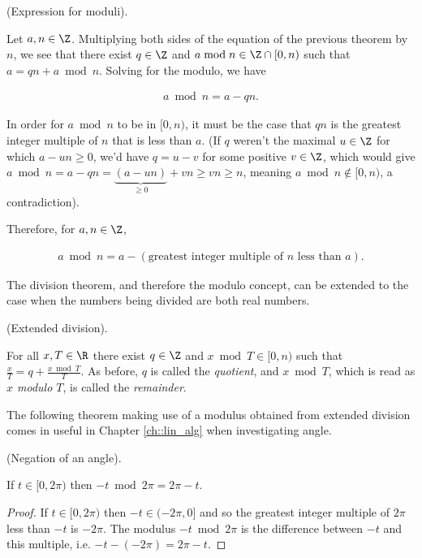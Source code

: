 \begin{deriv}
	(Expression for moduli).
	
	Let $a, n \in \Z$. Multiplying both sides of the equation of the previous theorem by $n$, we see that there exist $q \in \Z$ and $a \bmod n \in \Z \cap [0, n)$ such that $a = qn + a \bmod n$. Solving for the modulo, we have
	
	\begin{align*}
		a \bmod n = a - qn.
	\end{align*}
	
	In order for $a \bmod n$ to be in $[0, n)$, it must be the case that $qn$ is the greatest integer multiple of $n$ that is less than $a$. (If $q$ weren't the maximal $u \in \Z$ for which $a - un \geq 0$, we'd have $q = u - v$ for some positive $v \in \Z$, which would give $a \bmod n = a - qn = \underbrace{(a - un)}_{\geq 0} + vn \geq vn \geq n$, meaning $a \bmod n \notin [0, n)$, a contradiction).
	
	Therefore, for $a, n \in \Z$,
	
	\begin{align*}
		a \bmod n = a - (\text{greatest integer multiple of $n$ less than $a$}).
	\end{align*}
\end{deriv}

The division theorem, and therefore the modulo concept, can be extended to the case when the numbers being divided are both real numbers.

\begin{theorem}
    (Extended division).

    For all $x, T \in \R$ there exist $q \in \Z$ and $x \bmod T \in [0, n)$ such that $\frac{x}{T} = q + \frac{x \bmod T}{T}$. As before, $q$ is called the \textit{quotient}, and $x \bmod T$, which is read as \textit{$x$ modulo $T$}, is called the \textit{remainder}.
\end{theorem}

The following theorem making use of a modulus obtained from extended division comes in useful in Chapter \ref{ch::lin_alg} when investigating angle.

\begin{theorem}
\label{ch::appendix::thm::negation_of_angle}
    (Negation of an angle).

    If $t \in [0, 2\pi)$ then $-t \bmod 2\pi = 2\pi - t$.
\end{theorem}

\begin{proof}
    If $t \in [0, 2\pi)$ then $-t \in (-2\pi, 0]$ and so the greatest integer multiple of $2\pi$ less than $-t$ is $-2\pi$. The modulus $-t \bmod 2\pi$ is the difference between $-t$ and this multiple, i.e. $-t - (-2\pi) = 2\pi - t$.
\end{proof}

